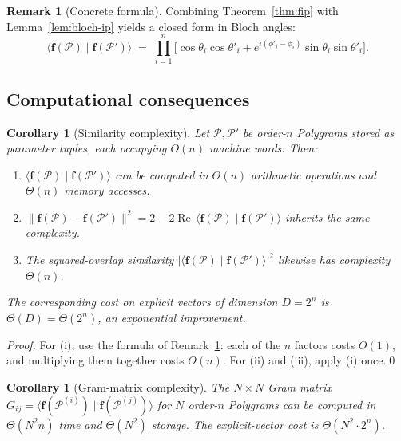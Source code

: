 \documentclass[11pt,letterpaper]{article}
\newtheorem{corollary}[theorem]{Corollary}
\theoremstyle{definition}
\newtheorem{remark}[theorem]{Remark}
\newcommand{\Polygram}{\mathcal{P}}
\newcommand{\re}{\operatorname{Re}}
\newcommand{\inner}[2]{\langle #1 \mid #2 \rangle}
\newcommand{\norm}[1]{\lVert #1 \rVert}
\newcommand{\abs}[1]{\lvert #1 \rvert}
\begin{document}
\begin{remark}[Concrete formula]
\label{rem:concrete-ip}
Combining Theorem~\ref{thm:fip} with Lemma~\ref{lem:bloch-ip} yields a closed
form in Bloch angles:
\[
\inner{\bm{f}(\Polygram)}{\bm{f}(\Polygram')}
   \;=\; \prod_{i=1}^{n} \bigg[
        \cos\theta_{i}\cos\theta'_{i}
      + e^{i(\phi'_{i} - \phi_{i})} \sin\theta_{i}\sin\theta'_{i}
   \bigg].
\]
\end{remark}

\subsection{Computational consequences}

\begin{corollary}[Similarity complexity]
\label{cor:complexity}
Let $\Polygram, \Polygram'$ be order-$n$ Polygrams stored as parameter tuples,
each occupying $O(n)$ machine words. Then:
\begin{enumerate}[label=(\roman*),leftmargin=*]
\item $\inner{\bm{f}(\Polygram)}{\bm{f}(\Polygram')}$ can be computed in
      $\Theta(n)$ arithmetic operations and $\Theta(n)$ memory accesses.
\item $\norm{\bm{f}(\Polygram) - \bm{f}(\Polygram')}^{2} = 2 - 2\re\,
      \inner{\bm{f}(\Polygram)}{\bm{f}(\Polygram')}$ inherits the same
      complexity.
\item The squared-overlap similarity
      $\abs{\inner{\bm{f}(\Polygram)}{\bm{f}(\Polygram')}}^{2}$ likewise has
      complexity $\Theta(n)$.
\end{enumerate}
The corresponding cost on explicit vectors of dimension $D = 2^{n}$ is
$\Theta(D) = \Theta(2^{n})$, an exponential improvement.
\end{corollary}
\begin{proof}
For (i), use the formula of Remark~\ref{rem:concrete-ip}: each of the $n$
factors costs $O(1)$, and multiplying them together costs $O(n)$. For (ii) and
(iii), apply (i) once.\qed
\end{proof}

\begin{corollary}[Gram-matrix complexity]
\label{cor:gram}
The $N \times N$ Gram matrix
$G_{ij} = \inner{\bm{f}(\Polygram^{(i)})}{\bm{f}(\Polygram^{(j)})}$ for $N$
order-$n$ Polygrams can be computed in $\Theta(N^{2} n)$ time and $\Theta(N^{2})$
storage. The explicit-vector cost is $\Theta(N^{2} \cdot 2^{n})$.
\end{corollary}
\end{document}
